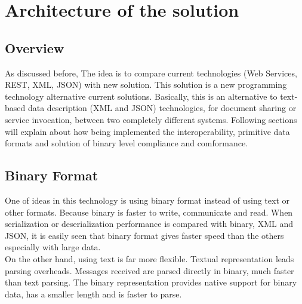 
\chapter{Architecture of the solution}
\label{chapter:architecture}


\section{Overview}
\label{section:overview}

As discussed before, The idea is to compare current technologies (Web Services, REST, XML, JSON) with new solution. This solution is a new programming technology alternative current solutions. Basically, this is an alternative to text-based data description (XML and JSON) technologies, for document sharing or service invocation, between two completely different systems. Following sections will explain about how being implemented the interoperability, primitive data formats and solution of binary level compliance and comformance.

\section{Binary Format}
\label{section:binary}

One of ideas in this technology is using binary format instead of using text or other formats. Because binary is faster to write, communicate and read. When serialization or deserialization performance is compared with binary, XML and JSON, it is easily seen that binary format gives faster speed than the others especially with large data\citep{binary:2016:Online}.\\

On the other hand, using text is far more flexible. Textual representation leads parsing overheads. Messages received are parsed directly in binary, much faster than text parsing. The binary representation provides native support for binary data, has a smaller length and is faster to parse.\\

